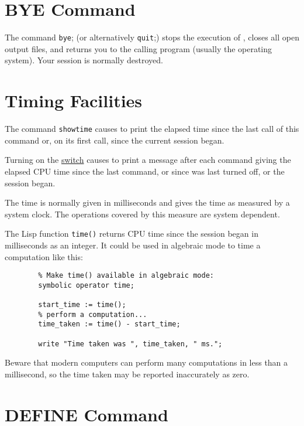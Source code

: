 \hypertarget{command:QUIT}{}
\hypertarget{command:BYE}{\section{BYE Command}}

The command \texttt{bye}; (or alternatively \texttt{quit};)
stops the execution
of {\REDUCE}, closes all open output files, and returns you to the calling
program (usually the operating system).  Your {\REDUCE} session is
normally destroyed.

\section{Timing Facilities}
\hypertarget{command:SHOWTIME}{}

The command
\texttt{showtime} causes
\REDUCE to print the elapsed time since the last call of this command
or, on its first call, since the current {\REDUCE} session began.

Turning on the \hyperlink{switch:TIME}{switch}
 causes {\REDUCE} to print a message
after each command giving the elapsed CPU time since the last command,
or since  was last turned off, or the session began.

The time is normally given in milliseconds and gives the time as
measured by a system clock.  The operations covered by this measure
are system dependent.

The Lisp function \texttt{time()} returns CPU time since the session
began in milliseconds as an integer.  It could be used in algebraic
mode to time a computation like this:
\begin{verbatim}
        % Make time() available in algebraic mode:
        symbolic operator time;

        start_time := time();
        % perform a computation...
        time_taken := time() - start_time;

        write "Time taken was ", time_taken, " ms.";
\end{verbatim}
Beware that modern computers can perform many computations in less
than a millisecond, so the time taken may be reported inaccurately as
zero.

\section{DEFINE Command}
\hypertarget{command:DEFINE}{}

